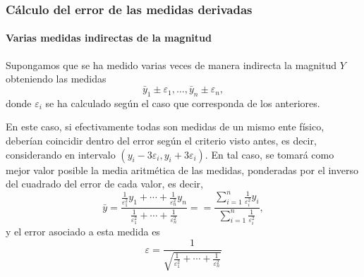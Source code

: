 \begin{frame}
	\frametitle{Cálculo del error de las medidas derivadas}
	\framesubtitle{Varias medidas indirectas de la magnitud}
	Supongamos que se ha medido varias veces de manera indirecta la magnitud $Y$ obteniendo las medidas
	\[
		\bar y_1\pm \varepsilon_1,\ldots, \bar y_n\pm\varepsilon_n,
	\] 
	donde $\varepsilon_i$ se ha calculado según el caso que corresponda de los anteriores.
	
	En este caso, si efectivamente todas son medidas de un mismo ente físico, deberían coincidir dentro del error según el
	criterio visto antes, es decir, considerando en intervalo $(y_i-3\varepsilon_i,y_i+3\varepsilon_i)$. En tal caso, se
	tomará como mejor valor posible la media aritmética de las medidas, ponderadas por el inverso del cuadrado del error de
	cada valor, es decir,
	\[
		\bar y =
		\frac{\frac{1}{\varepsilon_1^2}y_1+\cdots+\frac{1}{\varepsilon_n^2}y_n}{\frac{1}{\varepsilon_1^2}+\cdots+\frac{1}{\varepsilon_n^2}}
		= =\frac{\sum_{i=1}^n\frac{1}{\varepsilon_i^2}y_i}{\sum_{i=1}^n\frac{1}{\varepsilon_i^2}},
	\]
	y el error asociado a esta medida es
	\[
		\varepsilon = \frac{1}{\sqrt{\frac{1}{\varepsilon_1^2}+\cdots+\frac{1}{\varepsilon_n^2}}}
	\]
\end{frame}



